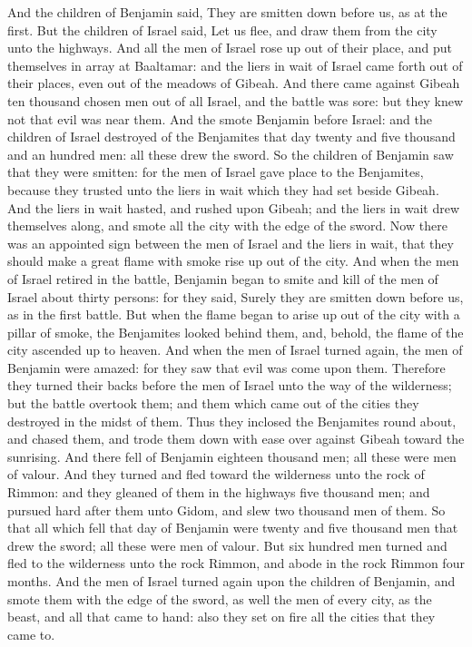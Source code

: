 \begin{biblechapter}
\verse And the children of Benjamin said, They are smitten down before us, as at the first. But the children of Israel said, Let us flee, and draw them from the city unto the highways.
\verse And all the men of Israel rose up out of their place, and put themselves in array at Baaltamar: and the liers in wait of Israel came forth out of their places, even out of the meadows of Gibeah.
\verse And there came against Gibeah ten thousand chosen men out of all Israel, and the battle was sore: but they knew not that evil was near them.
\verse And the \LORD smote Benjamin before Israel: and the children of Israel destroyed of the Benjamites that day twenty and five thousand and an hundred men: all these drew the sword.
\verse So the children of Benjamin saw that they were smitten: for the men of Israel gave place to the Benjamites, because they trusted unto the liers in wait which they had set beside Gibeah.
\verse And the liers in wait hasted, and rushed upon Gibeah; and the liers in wait drew themselves along, and smote all the city with the edge of the sword.
\verse Now there was an appointed sign between the men of Israel and the liers in wait, that they should make a great flame with smoke rise up out of the city.
\verse And when the men of Israel retired in the battle, Benjamin began to smite and kill of the men of Israel about thirty persons: for they said, Surely they are smitten down before us, as in the first battle.
\verse But when the flame began to arise up out of the city with a pillar of smoke, the Benjamites looked behind them, and, behold, the flame of the city ascended up to heaven.
\verse And when the men of Israel turned again, the men of Benjamin were amazed: for they saw that evil was come upon them.
\verse Therefore they turned their backs before the men of Israel unto the way of the wilderness; but the battle overtook them; and them which came out of the cities they destroyed in the midst of them.
\verse Thus they inclosed the Benjamites round about, and chased them, and trode them down with ease over against Gibeah toward the sunrising.
\verse And there fell of Benjamin eighteen thousand men; all these were men of valour.
\verse And they turned and fled toward the wilderness unto the rock of Rimmon: and they gleaned of them in the highways five thousand men; and pursued hard after them unto Gidom, and slew two thousand men of them.
\verse So that all which fell that day of Benjamin were twenty and five thousand men that drew the sword; all these were men of valour.
\verse But six hundred men turned and fled to the wilderness unto the rock Rimmon, and abode in the rock Rimmon four months.
\verse And the men of Israel turned again upon the children of Benjamin, and smote them with the edge of the sword, as well the men of every city, as the beast, and all that came to hand: also they set on fire all the cities that they came to.
\end{biblechapter}

